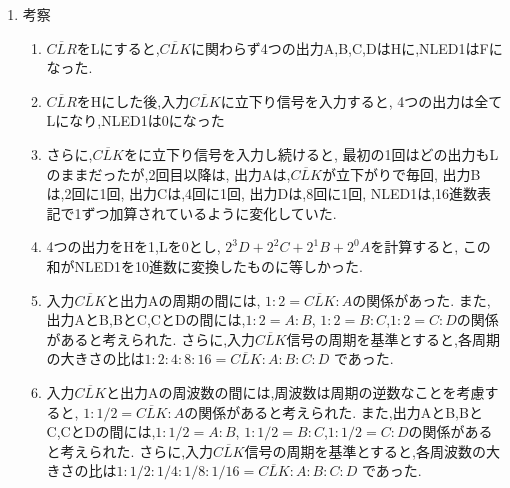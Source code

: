 \documentclass[twocolumn, 10pt,a4j]{jsarticle}
\begin{document}
      \begin{enumerate}
        \item 考察 \\
          \begin{enumerate}
            \item 
              $\overline{CLR }$をLにすると,$\overline{CLK}$に関わらず4つの出力A,B,C,DはHに,NLED1はFになった.
            \item 
              $\overline{CLR}$をHにした後,入力$\overline{CLK}$に立下り信号を入力すると,
              4つの出力は全てLになり,NLED1は0になった
            \item 
              さらに,$\overline{CLK}$をに立下り信号を入力し続けると,
              最初の1回はどの出力もLのままだったが,2回目以降は,
              出力Aは,$\overline{CLK}$が立下がりで毎回,
              出力Bは,2回に1回,
              出力Cは,4回に1回,
              出力Dは,8回に1回,
              NLED1は,16進数表記で1ずつ加算されているように変化していた.
            \item 
              4つの出力をHを1,Lを0とし,
              $2^3D + 2^2C + 2^1B + 2^0A$を計算すると,
              この和がNLED1を10進数に変換したものに等しかった.
            \item 
              入力$\overline{CLK}$と出力Aの周期の間には,
              $1 : 2 = \overline{CLK} : A$の関係があった.
              また,出力AとB,BとC,CとDの間には,$1 : 2 = A : B $,
              $1 : 2 = B : C $,$1 : 2 = C : D $の関係があると考えられた.
              さらに,入力$\overline{CLK}$信号の周期を基準とすると,各周期の大きさの比は$1 : 2 : 4 : 8 :16= \overline{CLK} : A:B:C:D$
              であった.
            \item 
              入力$\overline{CLK}$と出力Aの周波数の間には,周波数は周期の逆数なことを考慮すると,
              $1 : 1/2 = \overline{CLK} : A$の関係があると考えられた.
              また,出力AとB,BとC,CとDの間には,$1 : 1/2 = A : B $,
              $1 : 1/2 = B : C $,$1 : 1/2 = C : D $の関係があると考えられた.
              さらに,入力$\overline{CLK}$信号の周期を基準とすると,各周波数の大きさの比は$1 : 1/2 : 1/4 : 1/8 : 1/16= \overline{CLK} : A:B:C:D$
              であった.
          \end{enumerate}
      \end{enumerate}
      
      

  
\end{document}
